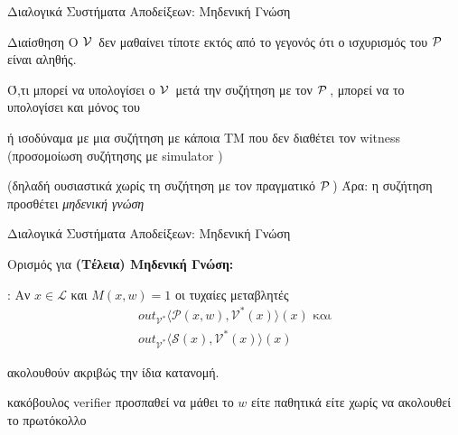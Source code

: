 \documentclass[10pt,handout]{beamer}
\begin{document}
\begin{frame}{Διαλογικά Συστήματα Αποδείξεων: Μηδενική Γνώση}

\begin{block}{Διαίσθηση}
	O $\mathcal{V}\,$ δεν μαθαίνει \alert{τίποτε εκτός από το γεγονός ότι ο ισχυρισμός του $\mathcal{P}\,$ είναι αληθής}. \pause
	 
	Ό,τι μπορεί να υπολογίσει ο $\mathcal{V}\,$ μετά την συζήτηση με τον $\mathcal{P}\,$, μπορεί να το υπολογίσει και \alert{μόνος} του
	
	ή ισοδύναμα με μια συζήτηση με κάποια TM που δεν διαθέτει τον witness \pause
	(προσομοίωση συζήτησης με simulator \siml) 
	 
	(δηλαδή ουσιαστικά χωρίς τη συζήτηση με τον πραγματικό $\mathcal{P}\,$)
	\pause
	Άρα: η συζήτηση προσθέτει \emph{μηδενική γνώση}
	
	\end{block}
\end{frame}

\begin{frame}{Διαλογικά Συστήματα Αποδείξεων: Μηδενική Γνώση}

\begin{block}{Ορισμός για \textbf{(Τέλεια) Μηδενική Γνώση:}}
 
 : 
\pause
Αν  $x \in \mathcal{L}$ και $M(x,w) = 1$ οι τυχαίες μεταβλητές 
\pause
\begin{align*}
  out_{\mathcal{V}^*}\langle \mathcal{P}(x,w), \mathcal{V}^*(x) \rangle (x)  \, \, \text{και} \\
  out_{\mathcal{V}^*}\langle \mathcal{S}(x), \mathcal{V}^*(x) \rangle(x)   
\end{align*}

ακολουθούν ακριβώς την ίδια κατανομή.
\end{block}

\alert{κακόβουλος verifier}  προσπαθεί να μάθει το $w$ είτε παθητικά είτε χωρίς να ακολουθεί το πρωτόκολλο
\end{frame}
\end{document}
